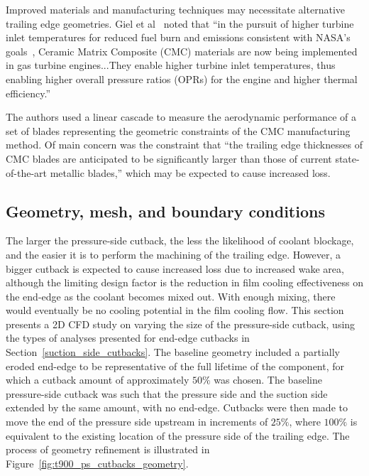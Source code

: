 \documentclass[a4paper, 11pt, oneside]{report}
\begin{document}
Improved materials and manufacturing techniques may necessitate alternative trailing edge geometries. Giel et al~\cite{giel_te_thickness} noted that ``in the pursuit of higher turbine inlet temperatures for reduced fuel burn and emissions consistent with NASA's goals~\cite{giel_nasa_reference}, Ceramic Matrix Composite (CMC) materials are now being implemented in gas turbine engines...They enable higher turbine inlet temperatures, thus enabling higher overall pressure ratios (OPRs) for the engine and higher thermal efficiency.'' 

The authors used a linear cascade to measure the aerodynamic performance of a set of blades representing the geometric constraints of the CMC manufacturing method. Of main concern was the constraint that ``the trailing edge thicknesses of CMC blades are anticipated to be significantly larger than those of current state-of-the-art metallic blades,'' which may be expected to cause increased loss.

\subsection{Geometry, mesh, and boundary conditions}

The larger the pressure-side cutback, the less the likelihood of coolant blockage, and the easier it is to perform the machining of the trailing edge. However, a bigger cutback is expected to cause increased loss due to increased wake area, although the limiting design factor is the reduction in film cooling effectiveness on the end-edge as the coolant becomes mixed out. With enough mixing, there would eventually be no cooling potential in the film cooling flow. This section presents a 2D CFD study on varying the size of the pressure-side cutback, using the types of analyses presented for end-edge cutbacks in Section~\ref{suction_side_cutbacks}. The baseline geometry included a partially eroded end-edge to be representative of the full lifetime of the component, for which a cutback amount of approximately $50\%$ was chosen. The baseline pressure-side cutback was such that the pressure side and the suction side extended by the same amount, with no end-edge. Cutbacks were then made to move the end of the pressure side upstream in increments of $25\%$, where $100\%$ is equivalent to the existing location of the pressure side of the trailing edge. The process of geometry refinement is illustrated in Figure~\ref{fig:t900_ps_cutbacks_geometry}.
\end{document}
